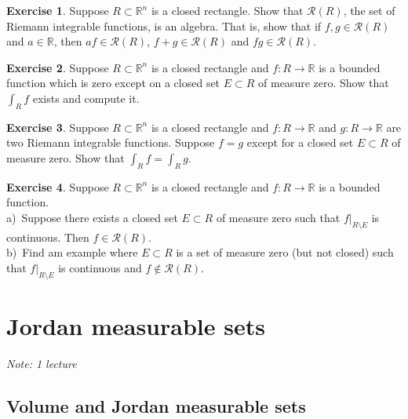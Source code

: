 \documentclass[12pt]{book}
\newcommand{\R}{{\mathbb{R}}}
\newcommand{\sR}{{\mathcal{R}}}
\newcommand{\sectionnotes}[1]{\noindent \emph{Note: #1} \medskip \par}
\newcommand{\sectionnewpage}{\clearpage}
\theoremstyle{plain}
\theoremstyle{remark}
\theoremstyle{definition}
\theoremstyle{exercise}
\newtheorem{exercise}{Exercise}[section]
\theoremstyle{example}
\begin{document}
\begin{exercise}
Suppose $R \subset \R^n$ is a closed rectangle.  Show that $\sR(R)$, the set
of Riemann integrable functions, is an algebra.  That is, show that
if $f,g \in \sR(R)$ and $a \in \R$, then $af \in \sR(R)$, $f+g \in \sR(R)$
and $fg \in \sR(R)$.
\end{exercise}

\begin{exercise}
Suppose $R \subset \R^n$ is a closed rectangle and
$f \colon R \to \R$ is a bounded function which is zero except on a closed set $E
\subset R$ of measure
zero.  Show that $\int_R f$ exists and compute it.
\end{exercise}

\begin{exercise}
Suppose $R \subset \R^n$ is a closed rectangle and
$f \colon R \to \R$ and
$g \colon R \to \R$ are two Riemann integrable functions.  Suppose $f = g$
except for a closed set $E \subset R$ of measure zero.  Show that $\int_R f = \int_R g$.
\end{exercise}

\begin{exercise}
Suppose $R \subset \R^n$ is a closed rectangle and
$f \colon R \to \R$ is a bounded function.\\
a)~Suppose there exists a closed set $E \subset R$ of measure zero such that
$f|_{R\setminus E}$ is continuous.  Then $f \in \sR(R)$.\\
b)~Find am example where $E \subset R$ is a set of measure zero (but not
closed) such that
$f|_{R\setminus E}$ is continuous and $f \not\in \sR(R)$.
\end{exercise}

%



\sectionnewpage
\section{Jordan measurable sets}
\label{sec:jordansets}

\sectionnotes{1 lecture}

\subsection{Volume and Jordan measurable sets}
\end{document}
